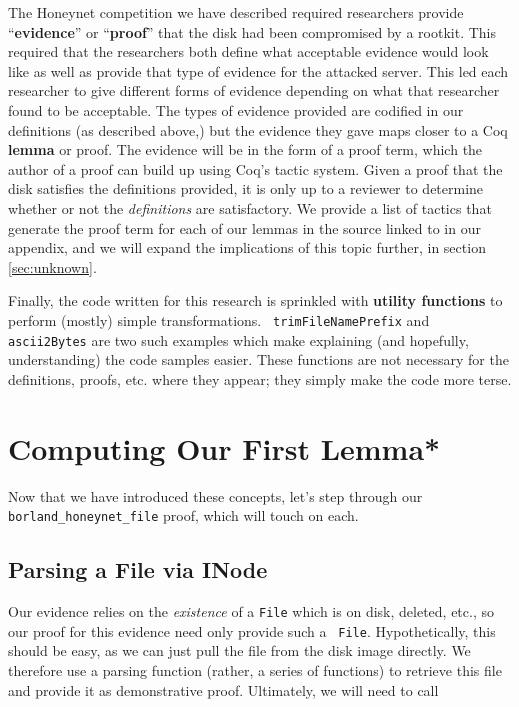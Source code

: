 \documentclass[nocopyrightspace]{sigplanconf}
\begin{document}
The Honeynet competition we have described required researchers provide
``{\bf evidence}'' or ``{\bf proof}'' that the disk had been compromised by a
rootkit. This required that the researchers both define what acceptable
evidence would look like as well as provide that type of evidence for the
attacked server. This led each researcher to give different forms of evidence
depending on what that researcher found to be acceptable. The types of
evidence provided are codified in our definitions (as described above,) but
the evidence they gave maps closer to a Coq {\bf lemma} or proof. The evidence
will be in the form of a proof term, which the author of a proof can build up
using Coq's tactic system. Given a proof that the disk satisfies the
definitions provided, it is only up to a reviewer to determine whether or not
the {\em definitions} are satisfactory. We provide a list of tactics that
generate the proof term for each of our lemmas in the source linked to in our
appendix, and we will expand the implications of this topic further, in
section \ref{sec:unknown}.

Finally, the code written for this research is sprinkled with {\bf utility
functions} to perform (mostly) simple transformations. {\tt
trimFileNamePrefix} and {\tt ascii2Bytes} are two such examples which make
explaining (and hopefully, understanding) the code samples easier. These
functions are not necessary for the definitions, proofs, etc. where they
appear; they simply make the code more terse.

\section{Computing Our First Lemma*}

Now that we have introduced these concepts, let's step through our {\tt
borland\_honeynet\_file} proof, which will touch on each.


\subsection{Parsing a File via INode}

Our evidence relies on the {\it existence} of a {\tt File} which is on disk,
deleted, etc., so our proof for this evidence need only provide such a {\tt
File}. Hypothetically, this should be easy, as we can just pull the file from
the disk image directly. We therefore use a parsing function (rather, a series
of functions) to retrieve this file and provide it as demonstrative proof.
Ultimately, we will need to call
\end{document}
